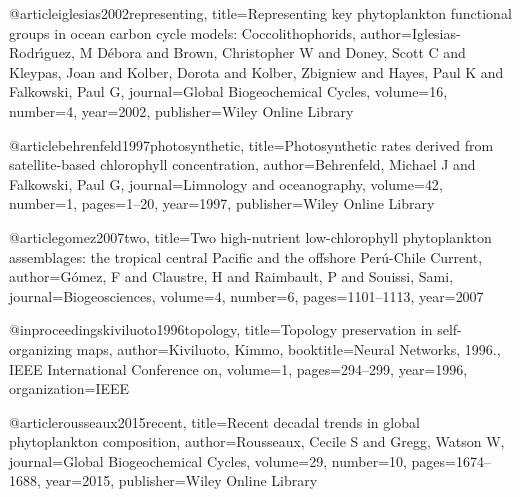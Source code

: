 {{{{{{{{{{{{@article{iglesias2002representing,
  title={Representing key phytoplankton functional groups in ocean carbon cycle models: Coccolithophorids},
  author={Iglesias-Rodr{\'\i}guez, M D{\'e}bora and Brown, Christopher W and Doney, Scott C and Kleypas, Joan and Kolber, Dorota and Kolber, Zbigniew and Hayes, Paul K and Falkowski, Paul G},
  journal={Global Biogeochemical Cycles},
  volume={16},
  number={4},
  year={2002},
  publisher={Wiley Online Library}
}

@article{behrenfeld1997photosynthetic,
  title={Photosynthetic rates derived from satellite-based chlorophyll concentration},
  author={Behrenfeld, Michael J and Falkowski, Paul G},
  journal={Limnology and oceanography},
  volume={42},
  number={1},
  pages={1--20},
  year={1997},
  publisher={Wiley Online Library}
}

@article{gomez2007two,
  title={Two high-nutrient low-chlorophyll phytoplankton assemblages: the tropical central Pacific and the offshore Per{\'u}-Chile Current},
  author={G{\'o}mez, F and Claustre, H and Raimbault, P and Souissi, Sami},
  journal={Biogeosciences},
  volume={4},
  number={6},
  pages={1101--1113},
  year={2007}
}


@inproceedings{kiviluoto1996topology,
  title={Topology preservation in self-organizing maps},
  author={Kiviluoto, Kimmo},
  booktitle={Neural Networks, 1996., IEEE International Conference on},
  volume={1},
  pages={294--299},
  year={1996},
  organization={IEEE}
}

@article{rousseaux2015recent,
  title={Recent decadal trends in global phytoplankton composition},
  author={Rousseaux, Cecile S and Gregg, Watson W},
  journal={Global Biogeochemical Cycles},
  volume={29},
  number={10},
  pages={1674--1688},
  year={2015},
  publisher={Wiley Online Library}
}

}}}}}}}}}}}}
